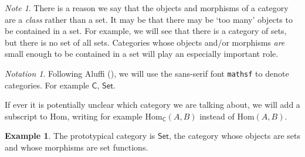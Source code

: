 \documentclass[a4paper]{report}
\newcommand{\Hom}{\mathrm{Hom}}
\theoremstyle{definition}
\newtheorem{example}{Example}[section]
\theoremstyle{plain}
\theoremstyle{remark}
\newtheorem{note}{Note}[section]
\newtheorem{notation}{Notation}[section]
\begin{document}
\begin{note}
  There is a reason we say that the objects and morphisms of a category are a \emph{class} rather than a set. It may be that there may be `too many' objects to be contained in a set. For example, we will see that there is a category of sets, but there is no set of all sets. Categories whose objects and/or morphisms \emph{are} small enough to be contained in a set will play an especially important role.
\end{note}

\begin{notation}
  Following Aluffi (\cite{aluffi-algebra-chapter-0}), we will use the sans-serif font \texttt{mathsf} to denote categories. For example $\mathsf{C}$, $\mathsf{Set}$.

  If ever it is potentially unclear which category we are talking about, we will add a subscript to $\Hom$, writing for example $\Hom_{\mathsf{C}}(A,B)$ instead of $\Hom(A,B)$.
\end{notation}

\begin{example}
  The prototypical category is $\mathsf{Set}$, the category whose objects are sets and whose morphisms are set functions.  
\end{example}
\end{document}
